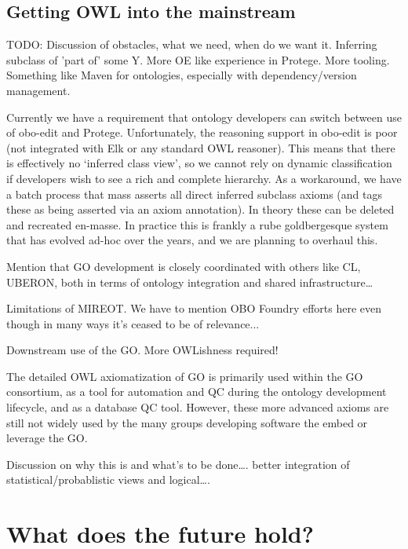 \documentclass{llncs}
\begin{document}
\subsection{Getting OWL into the mainstream}



TODO: Discussion of obstacles, what we need, when do we want it. Inferring
subclass of 'part of' some Y. More OE like experience in Protege. More
tooling. Something like Maven for ontologies, especially with
dependency/version management.

Currently we have a requirement that ontology developers can switch between use of obo-edit and Protege. Unfortunately, the reasoning support in obo-edit is poor (not integrated with Elk or any standard OWL reasoner). This means that there is effectively no ‘inferred class view’, so we cannot rely on dynamic classification if developers wish to see a rich and complete hierarchy. As a workaround, we have a batch process that mass asserts all direct inferred subclass axioms (and tags these as being asserted via an axiom annotation). In theory these can be deleted and recreated en-masse. In practice this is frankly a rube goldbergesque system that has evolved ad-hoc over the years, and we are planning to overhaul this.

Mention that GO development is closely coordinated with others like CL, UBERON, both in terms of ontology integration and shared infrastructure…

Limitations of MIREOT. We have to mention OBO Foundry efforts here even though in many ways it’s ceased to be of relevance...

Downstream use of the GO. More OWLishness required!

The detailed OWL axiomatization of GO is primarily used within the GO consortium, as a tool for automation and QC during the ontology development lifecycle, and as a database QC tool. However, these more advanced axioms are still not widely used by the many groups developing software the embed or leverage the GO.

Discussion on why this is and what’s to be done…. better integration of statistical/probablistic views and logical….


\section{What does the future hold?}
\end{document}
